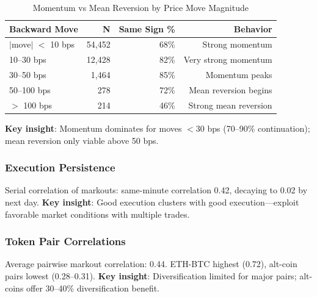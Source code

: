 \documentclass[12pt,a4paper]{article}
\begin{document}
\begin{table}[H]
\centering
\caption{Momentum vs Mean Reversion by Price Move Magnitude}
\begin{tabular}{lrrr}
\toprule
\textbf{Backward Move} & \textbf{N} & \textbf{Same Sign \%} & \textbf{Behavior} \\
\midrule
$|$move$|$ $<$ 10 bps & 54,452 & 68\% & Strong momentum \\
10--30 bps & 12,428 & 82\% & Very strong momentum \\
30--50 bps & 1,464 & 85\% & Momentum peaks \\
50--100 bps & 278 & 72\% & Mean reversion begins \\
$>$ 100 bps & 214 & 46\% & Strong mean reversion \\
\bottomrule
\end{tabular}
\end{table}

\textbf{Key insight}: Momentum dominates for moves $<$30 bps (70--90\% continuation); mean reversion only viable above 50 bps.

\subsubsection{Execution Persistence}

Serial correlation of markouts: same-minute correlation 0.42, decaying to 0.02 by next day. \textbf{Key insight}: Good execution clusters with good execution---exploit favorable market conditions with multiple trades.

\subsubsection{Token Pair Correlations}

Average pairwise markout correlation: 0.44. ETH-BTC highest (0.72), alt-coin pairs lowest (0.28--0.31). \textbf{Key insight}: Diversification limited for major pairs; alt-coins offer 30--40\% diversification benefit.
\end{document}
